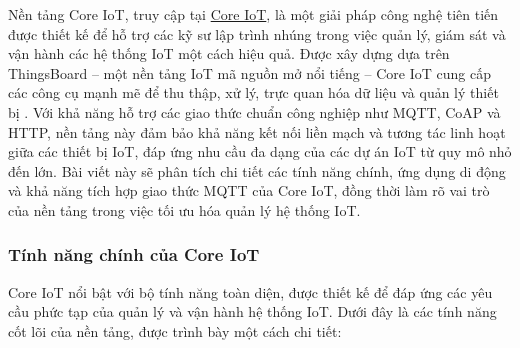 Nền tảng Core IoT, truy cập tại \href{https://app.coreiot.io/}{Core IoT}, là một giải pháp công nghệ tiên tiến được thiết kế để hỗ trợ các kỹ sư lập trình nhúng trong việc quản lý, giám sát và vận hành các hệ thống IoT một cách hiệu quả. Được xây dựng dựa trên ThingsBoard – một nền tảng IoT mã nguồn mở nổi tiếng – Core IoT cung cấp các công cụ mạnh mẽ để thu thập, xử lý, trực quan hóa dữ liệu và quản lý thiết bị \cite{ThingsBoard}. Với khả năng hỗ trợ các giao thức chuẩn công nghiệp như MQTT, CoAP và HTTP, nền tảng này đảm bảo khả năng kết nối liền mạch và tương tác linh hoạt giữa các thiết bị IoT, đáp ứng nhu cầu đa dạng của các dự án IoT từ quy mô nhỏ đến lớn. Bài viết này sẽ phân tích chi tiết các tính năng chính, ứng dụng di động và khả năng tích hợp giao thức MQTT của Core IoT, đồng thời làm rõ vai trò của nền tảng trong việc tối ưu hóa quản lý hệ thống IoT.

\subsubsection{Tính năng chính của Core IoT}

Core IoT nổi bật với bộ tính năng toàn diện, được thiết kế để đáp ứng các yêu cầu phức tạp của quản lý và vận hành hệ thống IoT. Dưới đây là các tính năng cốt lõi của nền tảng, được trình bày một cách chi tiết:

